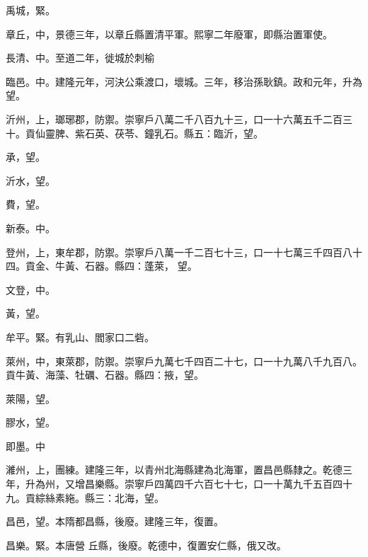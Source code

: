 \begin{pinyinscope}
 禹城，緊。



 章丘，中，景德三年，以章丘縣置清平軍。熙寧二年廢軍，即縣治置軍使。



 長清、中。至道二年，徙城於刺榆



 臨邑。中。建隆元年，河決公乘渡口，壞城。三年，移治孫耿鎮。政和元年，升為望。



 沂州，上，瑯琊郡，防禦。崇寧戶八萬二千八百九十三，口一十六萬五千二百三十。貢仙靈脾、紫石英、茯苓、鐘乳石。縣五：臨沂，望。



 承，望。



 沂水，望。



 費，望。



 新泰。中。



 登州，上，東牟郡，防禦。崇寧戶八萬一千二百七十三，口一十七萬三千四百八十四。貢金、牛黃、石器。縣四：蓬萊，
 望。



 文登，中。



 黃，望。



 牟平。緊。有乳山、閻家口二砦。



 萊州，中，東萊郡，防禦。崇寧戶九萬七千四百二十七，口一十九萬八千九百八。貢牛黃、海藻、牡礪、石器。縣四：掖，望。



 萊陽，望。



 膠水，望。



 即墨。中



 濰州，上，團練。建隆三年，以青州北海縣建為北海軍，置昌邑縣隸之。乾德三年，升為州，又增昌樂縣。崇寧戶四萬四千六百七十七，口一十萬九千五百四十九。貢綜絲素絁。縣三：北海，望。



 昌邑，望。本隋都昌縣，後廢。建隆三年，復置。



 昌樂。緊。本唐營
 丘縣，後廢。乾德中，復置安仁縣，俄又改。




\end{pinyinscope}
